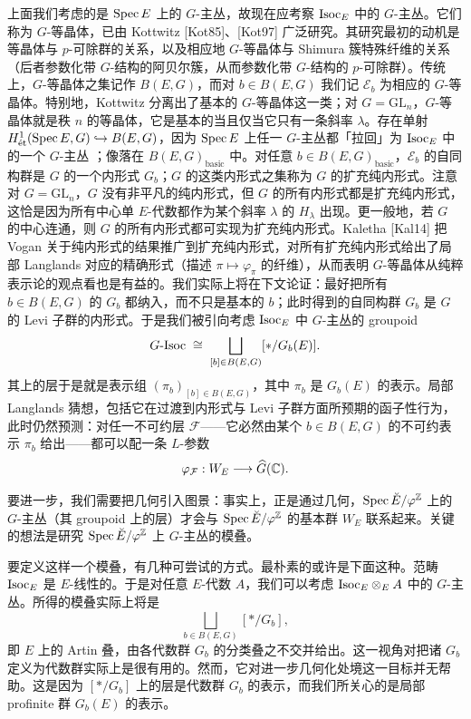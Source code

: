 上面我们考虑的是 $\operatorname{Spec} E$ 上的 $G$-主丛，故现在应考察 $\mathrm{Isoc}_E$ 中的 $G$-主丛。它们称为 $G$-等晶体，已由 Kottwitz [Kot85]、[Kot97] 广泛研究。其研究最初的动机是等晶体与 $p$-可除群的关系，以及相应地 $G$-等晶体与 Shimura 簇特殊纤维的关系（后者参数化带 $G$-结构的阿贝尔簇，从而参数化带 $G$-结构的 $p$-可除群）。传统上，$G$-等晶体之集记作 $B(E,G)$，而对 $b\in B(E,G)$ 我们记 $\mathcal{E}_b$ 为相应的 $G$-等晶体。特别地，Kottwitz 分离出了基本的 $G$-等晶体这一类；对 $G=\mathrm{GL}_n$，$G$-等晶体就是秩 $n$ 的等晶体，它是基本的当且仅当它只有一条斜率 $\lambda$。存在单射 $H^1_{\text{ét}}(\operatorname{Spec} E,G)\hookrightarrow B(E,G)$，因为 $\operatorname{Spec} E$ 上任一 $G$-主丛都「拉回」为 $\mathrm{Isoc}_E$ 中的一个 $G$-主丛
；像落在 $B(E,G)_{\mathrm{basic}}$ 中。对任意 $b\in B(E,G)_{\mathrm{basic}}$，$\mathcal{E}_b$ 的自同构群是 $G$ 的一个内形式 $G_b$；$G$ 的这类内形式之集称为 $G$ 的扩充纯内形式。注意对 $G=\mathrm{GL}_n$，$G$ 没有非平凡的纯内形式，但 $G$ 的所有内形式都是扩充纯内形式，这恰是因为所有中心单 $E$-代数都作为某个斜率 $\lambda$ 的 $H_\lambda$ 出现。更一般地，若 $G$ 的中心连通，则 $G$ 的所有内形式都可实现为扩充纯内形式。Kaletha [Kal14] 把 Vogan 关于纯内形式的结果推广到扩充纯内形式，对所有扩充纯内形式给出了局部 Langlands 对应的精确形式（描述 $\pi\mapsto\varphi_\pi$ 的纤维），从而表明 $G$-等晶体从纯粹表示论的观点看也是有益的。我们实际上将在下文论证：最好把所有 $b\in B(E,G)$ 的 $G_b$ 都纳入，而不只是基本的 $b$；此时得到的自同构群 $G_b$ 是 $G$ 的 Levi 子群的内形式。于是我们被引向考虑 $\mathrm{Isoc}_E$ 中 $G$-主丛的 groupoid
\[
  G\text{-}\mathrm{Isoc} \;\cong\; \bigsqcup_{[b]\in B(E,G)} [\ast/G_b(E)] .
\]
其上的层于是就是表示组 $(\pi_b)_{[b]\in B(E,G)}$，其中 $\pi_b$ 是 $G_b(E)$ 的表示。局部 Langlands 猜想，包括它在过渡到内形式与 Levi 子群方面所预期的函子性行为，此时仍然预测：对任一不可约层 $\mathcal{F}$——它必然由某个 $b\in B(E,G)$ 的不可约表示 $\pi_b$ 给出——都可以配一条 $L$-参数
\[
  \varphi_{\mathcal{F}} : W_E \longrightarrow \widehat{G}(\mathbb{C}).
\]

\leavevmode{}要进一步，我们需要把几何引入图景：事实上，正是通过几何，$\operatorname{Spec}\breve{E}/\varphi^{\mathbb{Z}}$ 上的 $G$-主丛（其 groupoid 上的层）才会与 $\operatorname{Spec}\breve{E}/\varphi^{\mathbb{Z}}$ 的基本群 $W_E$ 联系起来。关键的想法是研究 $\operatorname{Spec}\breve{E}/\varphi^{\mathbb{Z}}$ 上 $G$-主丛的模叠。

要定义这样一个模叠，有几种可尝试的方式。最朴素的或许是下面这种。范畴 $\mathrm{Isoc}_E$ 是 $E$-线性的。于是对任意 $E$-代数 $A$，我们可以考虑 $\mathrm{Isoc}_E\otimes_E A$ 中的 $G$-主丛。所得的模叠实际上将是
\[
  \bigsqcup_{b\in B(E,G)} [\ast/G_b],
\]
即 $E$ 上的 Artin 叠，由各代数群 $G_b$ 的分类叠之不交并给出。这一视角对把诸 $G_b$ 定义为代数群实际上是很有用的。然而，它对进一步几何化处境这一目标并无帮助。这是因为 $[\ast/G_b]$ 上的层是代数群 $G_b$ 的表示，而我们所关心的是局部 profinite 群 $G_b(E)$ 的表示。

